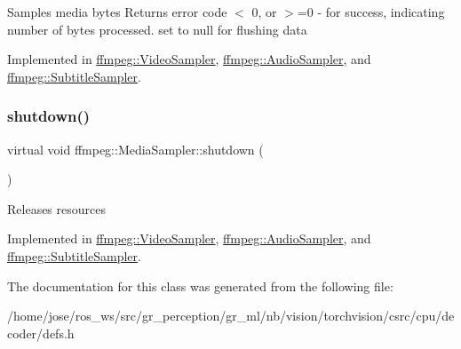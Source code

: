 Samples media bytes Returns error code $<$ 0, or $>$=0 -\/ for success, indicating number of bytes processed. set  to null for flushing data 

Implemented in \hyperlink{classffmpeg_1_1VideoSampler_aaafa56981b07358bd41603c06fc5e92c}{ffmpeg\+::\+Video\+Sampler}, \hyperlink{classffmpeg_1_1AudioSampler_a2188529ebad9ef4593a5ab11e8236989}{ffmpeg\+::\+Audio\+Sampler}, and \hyperlink{classffmpeg_1_1SubtitleSampler_ae4d48345d38512ece2999964731264dc}{ffmpeg\+::\+Subtitle\+Sampler}.

\mbox{\label{classffmpeg_1_1MediaSampler_ac8f2fee9cdf896871776a8202d70edd7}} 
\subsubsection{\texorpdfstring{shutdown()}{shutdown()}}
{\footnotesize\ttfamily virtual void ffmpeg\+::\+Media\+Sampler\+::shutdown (\begin{DoxyParamCaption}{ }\end{DoxyParamCaption})\hspace{0.3cm}{\ttfamily [pure virtual]}}

Releases resources 

Implemented in \hyperlink{classffmpeg_1_1VideoSampler_adebf591691d44b6f37bdcc74e3719554}{ffmpeg\+::\+Video\+Sampler}, \hyperlink{classffmpeg_1_1AudioSampler_a703ec8da8cc9e6e9701bed75cbc40085}{ffmpeg\+::\+Audio\+Sampler}, and \hyperlink{classffmpeg_1_1SubtitleSampler_aa2558e487cd9bb0438c5c95a6808ace7}{ffmpeg\+::\+Subtitle\+Sampler}.



The documentation for this class was generated from the following file\+:\begin{DoxyCompactItemize}
\item 
/home/jose/ros\+\_\+ws/src/gr\+\_\+perception/gr\+\_\+ml/nb/vision/torchvision/csrc/cpu/decoder/defs.\+h\end{DoxyCompactItemize}
